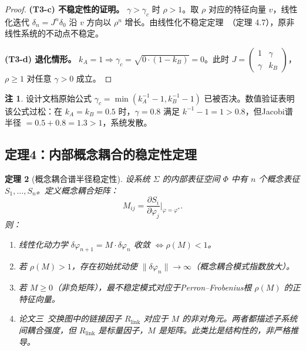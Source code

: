 \documentclass[12pt,a4paper]{article}
\newtheorem{theorem}{定理}[section]
\theoremstyle{definition}
\newtheorem{remark}[theorem]{注}
\newcommand{\mPhi}{\Phi}
\newcommand{\gamc}{\gamma_c}
\begin{document}
\begin{proof}
\textbf{(T3-c) 不稳定性的证明。}
$\gamma > \gamc$ 时 $\rho > 1$。取 $\rho$ 对应的特征向量 $v$，线性化迭代 $\delta_n = J^n \delta_0$ 沿 $v$ 方向以 $\rho^n$ 增长。由线性化不稳定定理~\cite{Khalil2002}（定理 4.7），原非线性系统的不动点不稳定。

\textbf{(T3-d) 退化情形。}
$k_A = 1 \Rightarrow \gamc = \sqrt{0 \cdot (1 - k_B)} = 0$。此时 $J = \begin{pmatrix} 1 & \gamma \\ \gamma & k_B \end{pmatrix}$，$\rho \geq 1$ 对任意 $\gamma > 0$ 成立。
\end{proof}

\begin{remark}
设计文档原始公式 $\gamc = \min(k_A^{-1} - 1, k_B^{-1} - 1)$ 已被否决。数值验证表明该公式过松：在 $k_A = k_B = 0.5$ 时，$\gamma = 0.8$ 满足 $k^{-1} - 1 = 1 > 0.8$，但Jacobi谱半径 $= 0.5 + 0.8 = 1.3 > 1$，系统发散。
\end{remark}

\subsection{定理4：内部概念耦合的稳定性定理}

\begin{theorem}[概念耦合谱半径稳定性]
\label{thm:t4}
设系统 $\Sigma$ 的内部表征空间 $\mPhi$ 中有 $n$ 个概念表征 $S_1, \ldots, S_n$。定义概念耦合矩阵：
\begin{equation}
\label{eq:M}
M_{ij} = \frac{\partial S_i}{\partial \varphi_j}\bigg|_{\varphi = \varphi^*}.
\end{equation}
则：
\begin{enumerate}[label=(T4-\alph*)]
\item 线性化动力学 $\delta\varphi_{n+1} = M \cdot \delta\varphi_n$ 收敛 $\iff \rho(M) < 1$。
\item 若 $\rho(M) > 1$，存在初始扰动使 $\|\delta\varphi_n\| \to \infty$（概念耦合模式指数放大）。
\item 若 $M \geq 0$（非负矩阵），最不稳定模式对应于Perron--Frobenius根 $\rho(M)$ 的正特征向量。
\item [结构类比] 论文三~\cite{PaperIII}交换图中的链接因子 $R_{\mathrm{link}}$ 对应于 $M$ 的非对角元。两者都描述子系统间耦合强度，但 $R_{\mathrm{link}}$ 是标量因子，$M$ 是矩阵。此类比是结构性的，非严格推导。
\end{enumerate}
\end{theorem}
\end{document}
